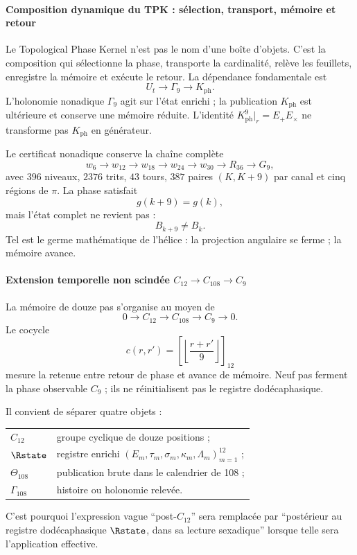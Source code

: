 \paragraph{Composition dynamique du TPK : sélection, transport, mémoire et retour}

Le Topological Phase Kernel n'est pas le nom d'une boîte d'objets. C'est la
composition qui sélectionne la phase, transporte la cardinalité, relève les feuillets,
enregistre la mémoire et exécute le retour. La dépendance fondamentale est
\[
U_t\longrightarrow\Gamma_9\longrightarrow K_{\mathrm{ph}}.
\]
L'holonomie nonadique \(\Gamma_9\) agit sur l'état enrichi ; la
publication \(K_{\mathrm{ph}}\) est ultérieure et conserve une mémoire réduite. L'identité
\(K_{\mathrm{ph}}^9|_r=E_+E_\times\) ne transforme pas \(K_{\mathrm{ph}}\) en
générateur.

Le certificat nonadique conserve la chaîne complète
\[
w_6\to w_{12}\to w_{18}\to w_{24}\to w_{30}
\to R_{36}\to G_9,
\]
avec \(396\) niveaux, \(2376\) trits, \(43\) tours, \(387\) paires
\((K,K+9)\) par canal et cinq régions de \(\pi\). La phase satisfait
\[
g(k+9)=g(k),
\]
mais l'état complet ne revient pas :
\[
B_{k+9}\ne B_k.
\]
Tel est le germe mathématique de l'hélice : la projection angulaire se ferme ; la
mémoire avance.

\paragraph{Extension temporelle non scindée \(C_{12}\to C_{108}\to C_9\)}

La mémoire de douze pas s'organise au moyen de
\begin{equation}
0\longrightarrow C_{12}\longrightarrow C_{108}
\longrightarrow C_9\longrightarrow0.
\label{eq:extension-108}
\end{equation}
Le cocycle
\[
c(r,r')=\left[\left\lfloor\frac{r+r'}9\right\rfloor\right]_{12}
\]
mesure la retenue entre retour de phase et avance de mémoire. Neuf pas ferment
la phase observable \(C_9\) ; ils ne réinitialisent pas le registre dodécaphasique.

Il convient de séparer quatre objets :
\begin{center}
\begin{tabularx}{.95\textwidth}{>{\bfseries}l X}
\toprule
\(C_{12}\) & groupe cyclique de douze positions ;\\
\(\Rstate\) & registre enrichi \((E_m,\tau_m,\sigma_m,\kappa_m,\Lambda_m)_{m=1}^{12}\) ;\\
\(\Theta_{108}\) & publication brute dans le calendrier de 108 ;\\
\(\Gamma_{108}\) & histoire ou holonomie relevée.\\
\bottomrule
\end{tabularx}
\end{center}
C'est pourquoi l'expression vague \enquote{post-\(C_{12}\)} sera remplacée par
\enquote{postérieur au registre dodécaphasique \(\Rstate\), dans sa lecture
sexadique} lorsque telle sera l'application effective.

